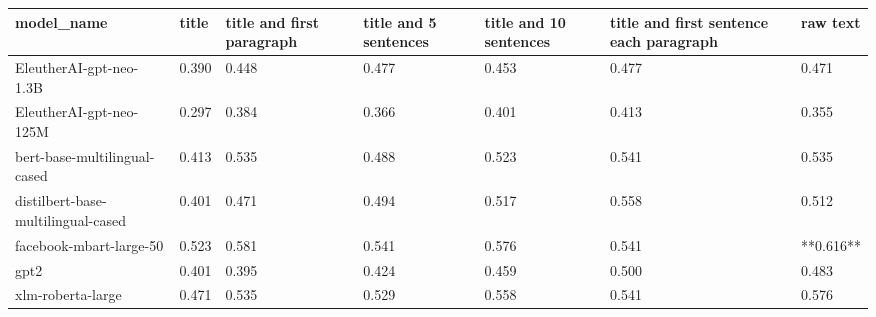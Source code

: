 \begin{tabular}{lllllll}
\toprule
                        model\_name & title & title and first paragraph & title and 5 sentences & title and 10 sentences & title and first sentence each paragraph &  raw text \\
\midrule
           EleutherAI-gpt-neo-1.3B & 0.390 &                     0.448 &                 0.477 &                  0.453 &                                   0.477 &     0.471 \\
           EleutherAI-gpt-neo-125M & 0.297 &                     0.384 &                 0.366 &                  0.401 &                                   0.413 &     0.355 \\
      bert-base-multilingual-cased & 0.413 &                     0.535 &                 0.488 &                  0.523 &                                   0.541 &     0.535 \\
distilbert-base-multilingual-cased & 0.401 &                     0.471 &                 0.494 &                  0.517 &                                   0.558 &     0.512 \\
           facebook-mbart-large-50 & 0.523 &                     0.581 &                 0.541 &                  0.576 &                                   0.541 & **0.616** \\
                              gpt2 & 0.401 &                     0.395 &                 0.424 &                  0.459 &                                   0.500 &     0.483 \\
                 xlm-roberta-large & 0.471 &                     0.535 &                 0.529 &                  0.558 &                                   0.541 &     0.576 \\
\bottomrule
\end{tabular}
